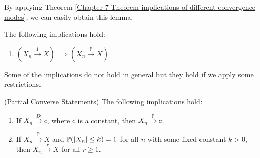 \documentclass{huhtakm-template-book}
\newcommand{\prob}{\mathbb{P}}
\begin{document}
    By applying Theorem \ref{Chapter 7 Theorem implications of different convergence modes}, we can easily obtain this lemma.
    \begin{lem}
        The following implications hold:
        \begin{enumerate}
            \item $(X_{n}\xrightarrow{1}X)\implies(X_{n}\xrightarrow{\prob}X)$
        \end{enumerate}
    \end{lem}
    Some of the implications do not hold in general but they hold if we apply some restrictions.
    \begin{thm}(Partial Converse Statements)
        The following implications hold:
        \begin{enumerate}
            \item If $X_{n}\xrightarrow{D}c$, where $c$ is a constant, then $X_{n}\xrightarrow{\prob}c$.
            \item If $X_{n}\xrightarrow{\prob}X$ and $\prob(\abs{X_{n}}\leq k)=1$ for all $n$ with some fixed constant $k>0$, then $X_{n}\xrightarrow{r}X$ for all $r\geq 1$.
        \end{enumerate}
    \end{thm}
\end{document}

